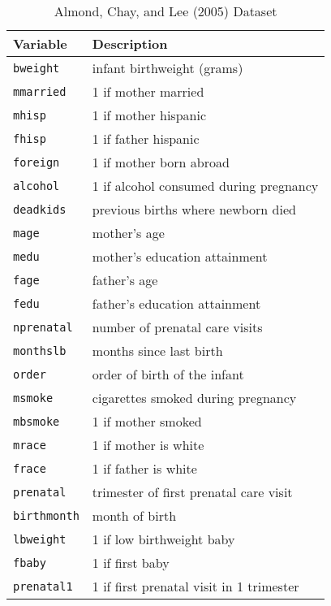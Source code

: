 \documentclass[12pt]{article}
\begin{document}
% 



\begin{table}[!hb]
	\renewcommand{\arraystretch}{1.2}
  \centering
  \caption{Almond, Chay, and Lee (2005) Dataset}
  \begin{tabular}{@{\extracolsep{5pt}} ll @{}}
    \toprule

    \textbf{Variable} & \textbf{Description} \\

    \midrule

    \texttt{bweight} & infant birthweight (grams) \\
    \texttt{mmarried} & 1 if mother married \\
    \texttt{mhisp} & 1 if mother hispanic \\
    \texttt{fhisp} & 1 if father hispanic \\
    \texttt{foreign} & 1 if mother born abroad \\
    \texttt{alcohol} & 1 if alcohol consumed during pregnancy \\
    \texttt{deadkids} & previous births where newborn died \\
    \texttt{mage} & mother's age \\
    \texttt{medu} & mother's education attainment \\
    \texttt{fage} & father's age \\
    \texttt{fedu} & father's education attainment \\
    \texttt{nprenatal} & number of prenatal care visits \\
    \texttt{monthslb} & months since last birth \\
    \texttt{order} & order of birth of the infant \\
    \texttt{msmoke} & cigarettes smoked during pregnancy \\
    \texttt{mbsmoke} & 1 if mother smoked \\
    \texttt{mrace} & 1 if mother is white \\
    \texttt{frace} & 1 if father is white \\
    \texttt{prenatal} & trimester of first prenatal care visit \\
    \texttt{birthmonth} & month of birth \\
    \texttt{lbweight} & 1 if low birthweight baby \\
    \texttt{fbaby} & 1 if first baby \\
    \texttt{prenatal1} & 1 if first prenatal visit in 1 trimester \\
    
    \bottomrule
  \end{tabular}
\end{table}
\end{document}
